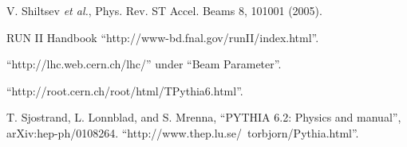 \documentclass{cmspaper}
\def\pythia {\texttt{PYTHIA }}
\begin{document}
\begin{thebibliography}{9}
V. Shiltsev {\em et al.}, Phys. Rev. ST Accel. Beams 8, 101001 (2005).


RUN II Handbook ``http://www-bd.fnal.gov/runII/index.html''.



``http://lhc.web.cern.ch/lhc/'' under ``Beam Parameter''.


``http://root.cern.ch/root/html/TPythia6.html''.

T. Sjostrand, L. Lonnblad, and S. Mrenna, ``PYTHIA 6.2: Physics and manual'', arXiv:hep-ph/0108264.
``http://www.thep.lu.se/~torbjorn/Pythia.html''.


 







\end{thebibliography}
\end{document}
